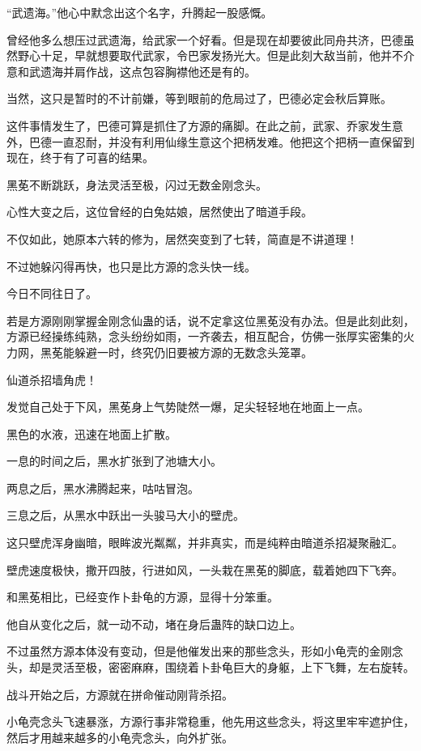 \begin{this_body}
“武遗海。”他心中默念出这个名字，升腾起一股感慨。

曾经他多么想压过武遗海，给武家一个好看。但是现在却要彼此同舟共济，巴德虽然野心十足，早就想要取代武家，令巴家发扬光大。但是此刻大敌当前，他并不介意和武遗海并肩作战，这点包容胸襟他还是有的。

当然，这只是暂时的不计前嫌，等到眼前的危局过了，巴德必定会秋后算账。

这件事情发生了，巴德可算是抓住了方源的痛脚。在此之前，武家、乔家发生意外，巴德一直忍耐，并没有利用仙缘生意这个把柄发难。他把这个把柄一直保留到现在，终于有了可喜的结果。

黑莬不断跳跃，身法灵活至极，闪过无数金刚念头。

心性大变之后，这位曾经的白兔姑娘，居然使出了暗道手段。

不仅如此，她原本六转的修为，居然突变到了七转，简直是不讲道理！

不过她躲闪得再快，也只是比方源的念头快一线。

今日不同往日了。

若是方源刚刚掌握金刚念仙蛊的话，说不定拿这位黑莬没有办法。但是此刻此刻，方源已经操练纯熟，念头纷纷如雨，一齐袭去，相互配合，仿佛一张厚实密集的火力网，黑莬能躲避一时，终究仍旧要被方源的无数念头笼罩。

仙道杀招墙角虎！

发觉自己处于下风，黑莬身上气势陡然一爆，足尖轻轻地在地面上一点。

黑色的水液，迅速在地面上扩散。

一息的时间之后，黑水扩张到了池塘大小。

两息之后，黑水沸腾起来，咕咕冒泡。

三息之后，从黑水中跃出一头骏马大小的壁虎。

这只壁虎浑身幽暗，眼眸波光粼粼，并非真实，而是纯粹由暗道杀招凝聚融汇。

壁虎速度极快，撒开四肢，行进如风，一头栽在黑莬的脚底，载着她四下飞奔。

和黑莬相比，已经变作卜卦龟的方源，显得十分笨重。

他自从变化之后，就一动不动，堵在身后蛊阵的缺口边上。

不过虽然方源本体没有变动，但是他催发出来的那些念头，形如小龟壳的金刚念头，却是灵活至极，密密麻麻，围绕着卜卦龟巨大的身躯，上下飞舞，左右旋转。

战斗开始之后，方源就在拼命催动刚背杀招。

小龟壳念头飞速暴涨，方源行事非常稳重，他先用这些念头，将这里牢牢遮护住，然后才用越来越多的小龟壳念头，向外扩张。


\end{this_body}
